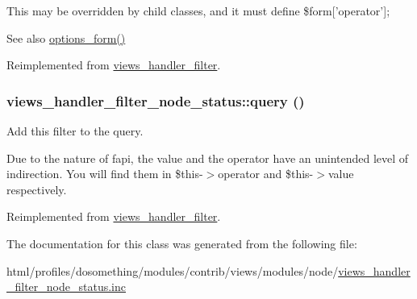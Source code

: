 This may be overridden by child classes, and it must define \$form\mbox{[}'operator'\mbox{]};

\begin{DoxySeeAlso}{See also}
\hyperlink{classviews__handler__filter_af14c69367162057a32709a6340de0988}{options\_\-form()} 
\end{DoxySeeAlso}


Reimplemented from \hyperlink{classviews__handler__filter_a8c77c0a8bba8c3ceceae8950fc7b1121}{views\_\-handler\_\-filter}.\hypertarget{classviews__handler__filter__node__status_a4f5351bb3567b5fe8bca111ffca83690}{
\subsubsection[{query}]{\setlength{\rightskip}{0pt plus 5cm}views\_\-handler\_\-filter\_\-node\_\-status::query ()}}
\label{classviews__handler__filter__node__status_a4f5351bb3567b5fe8bca111ffca83690}
Add this filter to the query.

Due to the nature of fapi, the value and the operator have an unintended level of indirection. You will find them in \$this-\/$>$operator and \$this-\/$>$value respectively. 

Reimplemented from \hyperlink{classviews__handler__filter_a8e513b3abbc2559f37b550ca4957b4ae}{views\_\-handler\_\-filter}.

The documentation for this class was generated from the following file:\begin{DoxyCompactItemize}
\item 
html/profiles/dosomething/modules/contrib/views/modules/node/\hyperlink{views__handler__filter__node__status_8inc}{views\_\-handler\_\-filter\_\-node\_\-status.inc}\end{DoxyCompactItemize}

